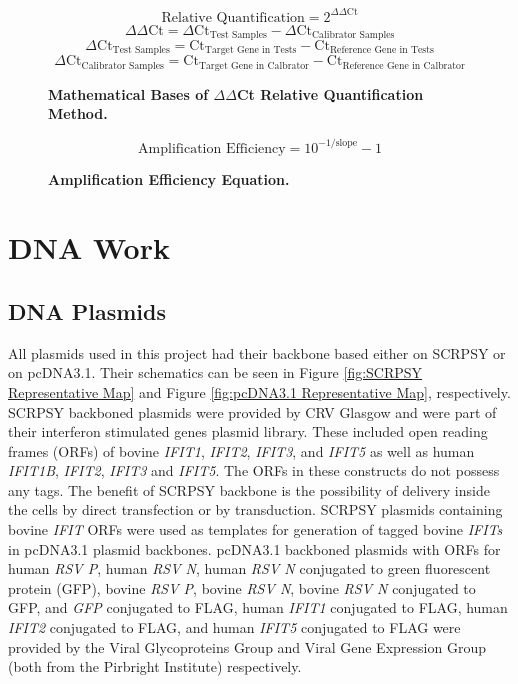 \begin{figure}
$$\mbox{Relative Quantification} = 2^{\Delta\Delta \mbox{Ct}}$$
$$\Delta\Delta \mbox{Ct} = \Delta \mbox{Ct}_{\mbox{Test Samples}}-\Delta \mbox{Ct}_{\mbox{Calibrator Samples}}$$
$$\Delta \mbox{Ct}_{\mbox{Test Samples}} = \mbox{Ct}_{\mbox{Target Gene in Tests}}-\mbox{Ct}_{\mbox{Reference Gene in Tests}}$$
$$\Delta \mbox{Ct}_{\mbox{Calibrator Samples}} = \mbox{Ct}_{\mbox{Target Gene in Calbrator}}-\mbox{Ct}_{\mbox{Reference Gene in Calbrator}}$$
\caption[Mathematical Bases of $\Delta\Delta$Ct Relative Quantification Method.]{\textbf{Mathematical Bases of $\Delta\Delta$Ct Relative Quantification Method.}}
\label{Mathematical Bases of delta delta Ct Relative Quantification Method}
\end{figure}

\begin{figure}
$$\mbox{Amplification Efficiency} = 10^{-1/\mbox{slope}}-1$$
\caption[Amplification Efficiency Equation.]{\textbf{Amplification Efficiency Equation.}}
\label{Amplification Efficiency Equation}
\end{figure}




\section{DNA Work} \label{DNA Work}
\subsection{DNA Plasmids} \label{DNA Plasmids}
All plasmids used in this project had their backbone based either on SCRPSY or on pcDNA3.1. Their schematics can be seen in Figure \ref{fig:SCRPSY Representative Map} and Figure \ref{fig:pcDNA3.1 Representative Map}, respectively. SCRPSY backboned plasmids were provided by CRV Glasgow and were part of their interferon stimulated genes plasmid library. These included open reading frames (ORFs) of bovine \textit{IFIT1}, \textit{IFIT2}, \textit{IFIT3}, and \textit{IFIT5} as well as human \textit{IFIT1B}, \textit{IFIT2}, \textit{IFIT3} and \textit{IFIT5}. The ORFs in these constructs do not possess any tags. The benefit of SCRPSY backbone is the possibility of delivery inside the cells by direct transfection or by transduction. SCRPSY plasmids containing bovine \textit{IFIT} ORFs were used as templates for generation of tagged bovine \textit{IFITs} in pcDNA3.1 plasmid backbones. pcDNA3.1 backboned plasmids with ORFs for human \textit{RSV P}, human \textit{RSV N}, human \textit{RSV N} conjugated to green fluorescent protein (GFP), bovine \textit{RSV P}, bovine \textit{RSV N}, bovine \textit{RSV N} conjugated to GFP, and \textit{GFP} conjugated to FLAG, human \textit{IFIT1} conjugated to FLAG, human \textit{IFIT2} conjugated to FLAG, and human \textit{IFIT5} conjugated to FLAG were provided by the Viral Glycoproteins Group and Viral Gene Expression Group (both from the Pirbright Institute) respectively.

